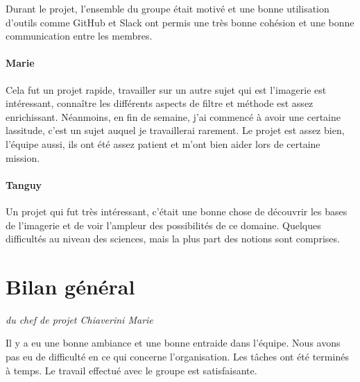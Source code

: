 \documentclass[12pt]{article}
\begin{document}
Durant le projet, l'ensemble du groupe était motivé et une bonne utilisation d'outils comme GitHub et Slack ont permis une très bonne cohésion et une bonne communication entre les membres.

\paragraph{ Marie}

Cela fut un projet rapide, travailler sur un autre sujet qui est l'imagerie est intéressant, connaître les différents aspects de filtre et méthode est assez enrichissant. Néanmoins, en fin de semaine, j'ai commencé à avoir une certaine lassitude, c'est un sujet auquel je travaillerai rarement. Le projet est assez bien, l'équipe aussi, ils ont été assez patient et m'ont bien aider lors de certaine mission.

\paragraph{ Tanguy}
	Un projet qui fut très intéressant, c'était une bonne chose de découvrir les bases de l'imagerie et de voir l'ampleur des possibilités de ce domaine. Quelques difficultés au niveau des sciences, mais la plus part des notions sont comprises.

\section{Bilan général}
\vspace{-0.5cm}\hspace{0.5cm}\textit{du chef de projet Chiaverini Marie}
\vspace{0.5cm}

Il y a eu une bonne ambiance et une bonne entraide dans l'équipe. Nous avons pas eu de difficulté en ce qui concerne l'organisation. Les tâches ont été terminés à temps. Le travail effectué avec le groupe est satisfaisante.
\end{document}
